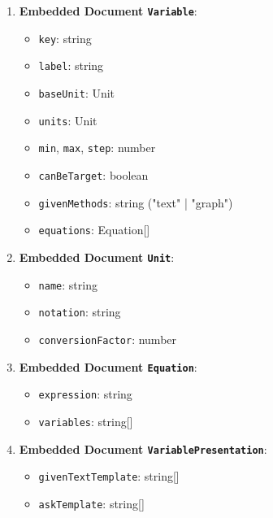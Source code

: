 \begin{enumerate}
    
    \item \textbf{Embedded Document \texttt{Variable}}:
    \begin{itemize}
        \item \texttt{key}: string
        \item \texttt{label}: string
        \item \texttt{baseUnit}: Unit
        \item \texttt{units}: Unit
        \item \texttt{min}, \texttt{max}, \texttt{step}: number
        \item \texttt{canBeTarget}: boolean
        \item \texttt{givenMethods}: string ("text" | "graph")
        \item \texttt{equations}: Equation[]
    \end{itemize}
    
    
    \item \textbf{Embedded Document \texttt{Unit}}:
    \begin{itemize}
        \item \texttt{name}: string
        \item \texttt{notation}: string
        \item \texttt{conversionFactor}: number
    \end{itemize}
    
    
    \item \textbf{Embedded Document \texttt{Equation}}:
    \begin{itemize}
        \item \texttt{expression}: string
        \item \texttt{variables}: string[]
    \end{itemize}
    
    
    \item \textbf{Embedded Document \texttt{VariablePresentation}}:
    \begin{itemize}
        \item \texttt{givenTextTemplate}: string[]
        \item \texttt{askTemplate}: string[]
    \end{itemize}
    

\end{enumerate}
